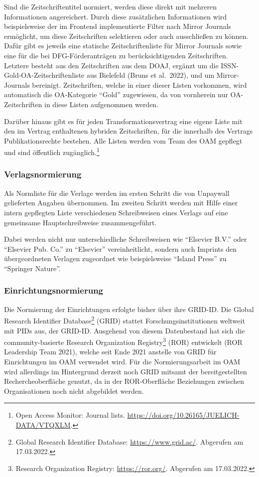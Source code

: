 \documentclass[a4paper,
fontsize=11pt,
oneside,
numbers=noperiodatend,
parskip=half-,
bibliography=totoc,
final
]{scrartcl}
\begin{document}
Sind die Zeitschriftentitel normiert, werden diese direkt mit mehreren
Informationen angereichert. Durch diese zusätzlichen Informationen wird
beispielsweise der im Frontend implementierte Filter nach Mirror
Journals ermöglicht, um diese Zeitschriften selektieren oder auch
ausschließen zu können. Dafür gibt es jeweils eine statische
Zeitschriftenliste für Mirror Journals sowie eine für die bei
DFG-Förderanträgen zu berücksichtigenden Zeitschriften. Letztere besteht
aus den Zeitschriften aus dem DOAJ, ergänzt um die
ISSN-Gold-OA-Zeitschriftenliste aus Bielefeld (Bruns et al.~2022), und
um Mirror-Journals bereinigt. Zeitschriften, welche in einer dieser
Listen vorkommen, wird automatisch die OA-Kategorie \enquote{Gold}
zugewiesen, da von vornherein nur OA-Zeitschriften in diese Listen
aufgenommen werden.

Darüber hinaus gibt es für jeden Transformationsvertrag eine eigene
Liste mit den im Vertrag enthaltenen hybriden Zeitschriften, für die
innerhalb des Vertrags Publikationsrechte bestehen. Alle Listen werden
vom Team des OAM gepflegt und sind öffentlich zugänglich.\footnote{Open
  Access Monitor: Journal lists.
  \url{https://doi.org/10.26165/JUELICH-DATA/VTQXLM}.}

\hypertarget{verlagsnormierung}{%
\subsubsection{Verlagsnormierung}\label{verlagsnormierung}}

Als Normliste für die Verlage werden im ersten Schritt die von Unpaywall
gelieferten Angaben übernommen. Im zweiten Schritt werden mit Hilfe
einer intern gepflegten Liste verschiedenen Schreibweisen eines Verlags
auf eine gemeinsame Hauptschreibweise zusammengeführt.

Dabei werden nicht nur unterschiedliche Schreibweisen wie
\enquote{Elsevier B.V.} oder \enquote{Elsevier Pub. Co.} zu
\enquote{Elsevier} vereinheitlicht, sondern auch Imprints den
übergeordneten Verlagen zugeordnet wie beispielsweise \enquote{Island
Press} zu \enquote{Springer Nature}.

\hypertarget{einrichtungsnormierung}{%
\subsubsection{Einrichtungsnormierung}\label{einrichtungsnormierung}}

Die Normierung der Einrichtungen erfolgte bisher über ihre GRID-ID. Die
Global Research Identifier Database\footnote{Global Research Identifier
  Database: \url{https://www.grid.ac/}. Abgerufen am 17.03.2022.} (GRID)
stattet Forschungsinstitutionen weltweit mit PIDs aus, der GRID-ID.
Ausgehend von diesem Datenbestand hat sich die community-basierte
Research Organization Registry\footnote{Research Organization Registry:
  \url{https://ror.org/}. Abgerufen am 17.03.2022.} (ROR) entwickelt
(ROR Leadership Team 2021), welche seit Ende 2021 anstelle von GRID für
Einrichtungen im OAM verwendet wird. Für die Normierungsarbeit im OAM
wird allerdings im Hintergrund derzeit noch GRID mitsamt der
bereitgestellten Rechercheoberfläche genutzt, da in der ROR-Oberfläche
Beziehungen zwischen Organisationen noch nicht abgebildet werden.
\end{document}

